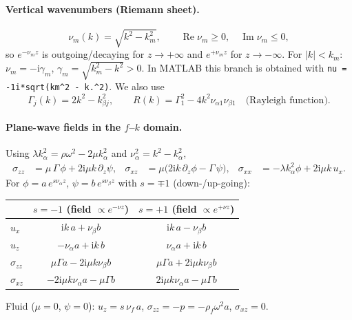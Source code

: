 \documentclass[11pt,a4paper]{article}
\newcommand{\ii}{\mathrm{i}}
\newcommand{\RE}{\operatorname{Re}}
\newcommand{\IM}{\operatorname{Im}}
\begin{document}
\paragraph{Vertical wavenumbers (Riemann sheet).}
\begin{equation}
  \nu_m(k)=\sqrt{k^2-k_m^2},\qquad \RE\nu_m\ge 0,\quad \IM\nu_m\le 0 ,
  \label{eq:branch}
\end{equation}
so $e^{-\nu_m z}$ is outgoing/decaying for $z\to+\infty$ and $e^{+\nu_m z}$ for $z\to-\infty$.
For $|k|<k_m$: $\nu_m=-\ii\gamma_m$, $\gamma_m=\sqrt{k_m^2-k^2}>0$.
In MATLAB this branch is obtained with \texttt{nu = -1i*sqrt(km\^{}2 - k.\^{}2)}.
We also use
\begin{equation}
  \Gamma_j(k)=2k^2-k_{\beta j}^2,\qquad
  R(k)=\Gamma_1^2-4k^2\nu_{\alpha1}\nu_{\beta1}\quad\text{(Rayleigh function)}.
\end{equation}

\paragraph{Plane-wave fields in the $f$--$k$ domain.}
Using $\lambda k_\alpha^2=\rho\omega^2-2\mu k_\alpha^2$ and $\nu_\alpha^2=k^2-k_\alpha^2$,
\begin{align}
  \sigma_{zz}&=\mu\,\Gamma\,\phi+2\ii\mu k\,\partial_z\psi, &
  \sigma_{xz}&=\mu\bigl(2\ii k\,\partial_z\phi-\Gamma\,\psi\bigr), &
  \sigma_{xx}&=-\lambda k_\alpha^2\phi+2\ii\mu k\,u_x .
\end{align}
For $\phi=a\,e^{s\nu_\alpha z}$, $\psi=b\,e^{s\nu_\beta z}$ with $s=\mp1$ (down-/up-going):

\begin{center}
\renewcommand{\arraystretch}{1.3}
\begin{tabular}{@{}lcc@{}}
\toprule
 & $s=-1$ (field $\propto e^{-\nu z}$) & $s=+1$ (field $\propto e^{+\nu z}$)\\
\midrule
$u_x$ & $\ii k\,a+\nu_\beta b$ & $\ii k\,a-\nu_\beta b$\\
$u_z$ & $-\nu_\alpha a+\ii k\,b$ & $\nu_\alpha a+\ii k\,b$\\
$\sigma_{zz}$ & $\mu\Gamma a-2\ii\mu k\nu_\beta b$ & $\mu\Gamma a+2\ii\mu k\nu_\beta b$\\
$\sigma_{xz}$ & $-2\ii\mu k\nu_\alpha a-\mu\Gamma b$ & $2\ii\mu k\nu_\alpha a-\mu\Gamma b$\\
\bottomrule
\end{tabular}
\end{center}

\noindent Fluid ($\mu=0$, $\psi=0$): $u_z=s\,\nu_f\,a$, $\sigma_{zz}=-p=-\rho_f\omega^2 a$,
$\sigma_{xz}=0$.
\end{document}
